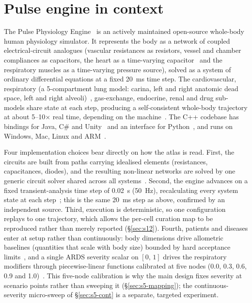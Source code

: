 \documentclass[pdflatex,sn-nature]{sn-jnl}%
\begin{document}
\tableofcontents


\section{Pulse engine in context}\label{sec:s1}

The Pulse Physiology Engine~\cite{bray2019} is an actively maintained open-source whole-body human physiology simulator. It represents the body as a network of coupled electrical-circuit analogues (vascular resistances as resistors, vessel and chamber compliances as capacitors, the heart as a time-varying capacitor~\cite{pulsecardiomethod} and the respiratory muscles as a time-varying pressure source), solved as a system of ordinary differential equations at a fixed 20~ms time step. The cardiovascular, respiratory (a 5-compartment lung model: carina, left and right anatomic dead space, left and right alveoli)~\cite{pulserespmethod}, gas-exchange, endocrine, renal and drug sub-models share state at each step, producing a self-consistent whole-body trajectory at about 5--10$\times$ real time, depending on the machine~\cite{pulsefaq}. The C++ codebase has bindings for Java, C\# and Unity~\cite{pulseabout} and an interface for Python~\cite{webb2022vent}, and runs on Windows, Mac, Linux and ARM~\cite{pulseabout}.

Four implementation choices bear directly on how the atlas is read. First, the circuits are built from paths carrying idealised elements (resistances, capacitances, diodes), and the resulting non-linear networks are solved by one generic circuit solver shared across all systems~\cite{pulsecircuit}. Second, the engine advances on a fixed transient-analysis time step of 0.02~s (50~Hz), recalculating every system state at each step~\cite{pulsesystem}; this is the same 20~ms step as above, confirmed by an independent source. Third, execution is deterministic, so one configuration replays to one trajectory, which allows the per-cell curation map to be reproduced rather than merely reported (\S\ref{sec:s12}). Fourth, patients and diseases enter at setup rather than continuously: body dimensions drive allometric baselines (quantities that scale with body size) bounded by hard acceptance limits~\cite{pulsepatientmethod}, and a single ARDS severity scalar on $[0,\,1]$ drives the respiratory modifiers through piecewise-linear functions calibrated at five nodes (0.0, 0.3, 0.6, 0.9 and 1.0)~\cite{pulserespmethod}. This five-node calibration is why the main design fixes severity at scenario points rather than sweeping it (\S\ref{sec:s5-mapping}); the continuous-severity micro-sweep of \S\ref{sec:s5-cont} is a separate, targeted experiment.
\end{document}
